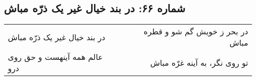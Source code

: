 \begin{center}
\section*{شماره ۶۶: در بند خیال غیر یک ذرّه مباش}
\label{sec:066}
\begin{longtable}{l p{0.5cm} r}
در بند خیال غیر یک ذرّه مباش
&&
در بحر ز خویش گم شو و قطره مباش
\\
عالم همه آینهست و حق روی درو
&&
تو روی نگر، به آینه غرّه مباش
\\
\end{longtable}
\end{center}

